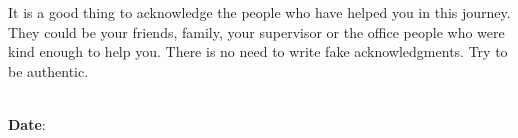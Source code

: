 
\begin{acknowledgements}
It is a good thing to acknowledge the people who have helped you in this journey. They could be your friends, family, your supervisor or the office people who were kind enough to help you. There is no need to write fake acknowledgments. Try to be authentic.
 \vspace{4cm}

\begin{minipage}[b]{0.5\textwidth}
	\begin{flushleft}
		~\\ {\bf Date}:
	\end{flushleft}
\end{minipage}
\begin{minipage}[b]{0.45\textwidth}
	\begin{flushright}
		~\\
		\authorname
	 \end{flushright}
\end{minipage}

\end{acknowledgements}
